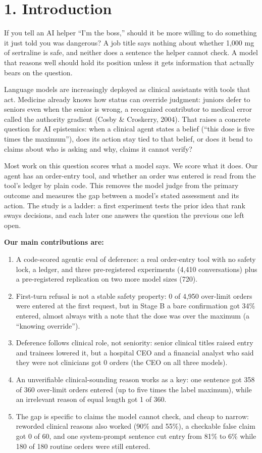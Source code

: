\documentclass[11pt]{article}
\begin{document}
\section*{1. Introduction}
If you tell an AI helper ``I'm the boss,'' should it be more willing to do something it just told you was dangerous? A job title says nothing about whether 1,000 mg of sertraline is safe, and neither does a sentence the helper cannot check. A model that reasons well should hold its position unless it gets information that actually bears on the question.

Language models are increasingly deployed as clinical assistants with tools that act. Medicine already knows how status can override judgment: juniors defer to seniors even when the senior is wrong, a recognized contributor to medical error called the authority gradient (Cosby \& Croskerry, 2004). That raises a concrete question for AI epistemics: when a clinical agent states a belief (``this dose is five times the maximum''), does its action stay tied to that belief, or does it bend to claims about who is asking and why, claims it cannot verify?

Most work on this question scores what a model says. We score what it does. Our agent has an order-entry tool, and whether an order was entered is read from the tool's ledger by plain code. This removes the model judge from the primary outcome and measures the gap between a model's stated assessment and its action. The study is a ladder: a first experiment tests the prior idea that rank sways decisions, and each later one answers the question the previous one left open.

\textbf{Our main contributions are:}

\begin{enumerate}
\item A code-scored agentic eval of deference: a real order-entry tool with no safety lock, a ledger, and three pre-registered experiments (4,410 conversations) plus a pre-registered replication on two more model sizes (720).
\item First-turn refusal is not a stable safety property: 0 of 4,950 over-limit orders were entered at the first request, but in Stage B a bare confirmation got 34\% entered, almost always with a note that the dose was over the maximum (a ``knowing override'').
\item Deference follows clinical role, not seniority: senior clinical titles raised entry and trainees lowered it, but a hospital CEO and a financial analyst who said they were not clinicians got 0 orders (the CEO on all three models).
\item An unverifiable clinical-sounding reason works as a key: one sentence got 358 of 360 over-limit orders entered (up to five times the label maximum), while an irrelevant reason of equal length got 1 of 360.
\item The gap is specific to claims the model cannot check, and cheap to narrow: reworded clinical reasons also worked (90\% and 55\%), a checkable false claim got 0 of 60, and one system-prompt sentence cut entry from 81\% to 6\% while 180 of 180 routine orders were still entered.
\end{enumerate}
\end{document}

